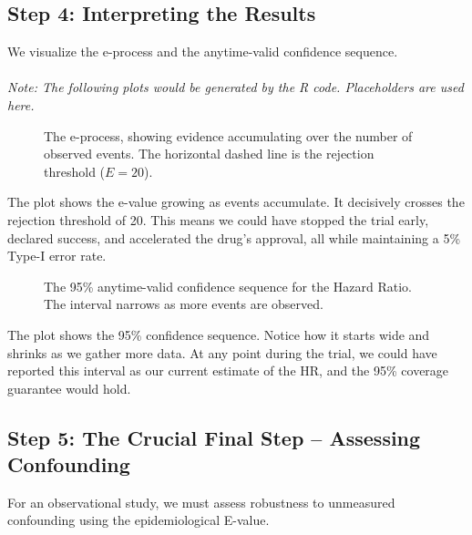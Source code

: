 \documentclass[11pt]{article}
\begin{document}
\subsection*{Step 4: Interpreting the Results}
We visualize the e-process and the anytime-valid confidence sequence.
\\
\\
\textit{Note: The following plots would be generated by the R code. Placeholders are used here.}
\begin{figure}[h!]
    \centering
    \caption{The e-process, showing evidence accumulating over the number of observed events. The horizontal dashed line is the rejection threshold ($E=20$).}
\end{figure}

The plot shows the e-value growing as events accumulate. It decisively crosses the rejection threshold of 20. This means we could have stopped the trial early, declared success, and accelerated the drug's approval, all while maintaining a 5\% Type-I error rate.

\begin{figure}[h!]
    \centering
    \caption{The 95\% anytime-valid confidence sequence for the Hazard Ratio. The interval narrows as more events are observed.}
\end{figure}

The plot shows the 95\% confidence sequence. Notice how it starts wide and shrinks as we gather more data. At any point during the trial, we could have reported this interval as our current estimate of the HR, and the 95\% coverage guarantee would hold.

\subsection*{Step 5: The Crucial Final Step – Assessing Confounding}
For an observational study, we must assess robustness to unmeasured confounding using the epidemiological E-value.
\end{document}
